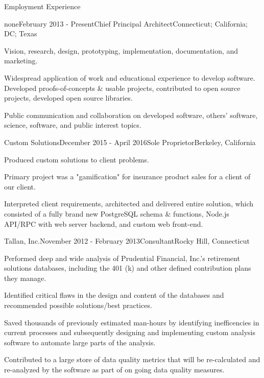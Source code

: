 \documentclass{resume} %
\begin{document}
\begin{rSection}{Employment Experience}

\begin{rSubsection}{none}{February 2013 - Present}{Chief Principal Architect}{Connecticut; California; DC; Texas}
\item Vision, research, design, prototyping, implementation, documentation, and marketing.
\item Widespread application of work and educational experience to develop software. Developed proofs-of-concepts \& usable projects, contributed to open source projects, developed open source libraries.
\item Public communication and collaboration on developed software, others' software, science, software, and public interest topics.
\end {rSubsection}

\begin{rSubsection}{Custom Solutions}{December 2015 - April 2016}{Sole Proprietor}{Berkeley, California}
\item Produced custom solutions to client problems.
\item Primary project was a "gamification" for insurance product sales for a client of our client.
\item Interpreted client requirements, architected and delivered entire solution, which consisted of a fully brand new PostgreSQL schema \& functions, Node.js API/RPC with web server backend, and custom web front-end.
\end {rSubsection}

\begin{rSubsection}{Tallan, Inc.}{November 2012 - February 2013}{Consultant}{Rocky Hill, Connecticut}
\item Performed deep and wide analysis of Prudential Financial, Inc.'s retirement solutions databases, including the 401 (k) and other defined contribution plans they manage.
\item Identified critical flaws in the design and content of the databases and recommended possible solutions/best practices.
\item Saved thousands of previously estimated man-hours by identifying inefficencies in current processes and subsequently designing and implementing custom analysis software to automate large parts of the analysis.
\item Contributed to a large store of data quality metrics that will be re-calculated and re-analyzed by the software as part of on going data quality measures.
\end {rSubsection}


\end{rSection}
\end{document}
